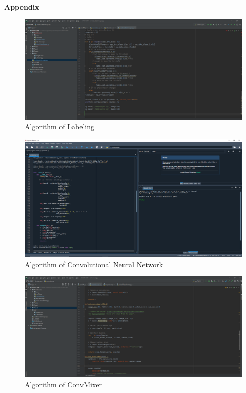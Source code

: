 \documentclass{article}
\begin{document}
\begin{center}
    \textbf{\Large Appendix}
\end{center}
\begin{figure}[H]
\begin{center}
    \includegraphics[scale=0.18]{Assets/image_creation_alg.png}
    \caption{Algorithm of Labeling}
\end{center}
\end{figure}
\noindent
\begin{figure}[H]
\begin{center}
    \includegraphics[scale=0.18]{Assets/cnn_implemantation.png}
    \caption{Algorithm of Convolutional Neural Network}
\end{center}
\end{figure}
\noindent
\begin{figure}[H]
\begin{center}
    \includegraphics[scale=0.18]{Assets/convmixer_implemantation.png}
    \caption{Algorithm of ConvMixer}
\end{center}
\end{figure}
\end{document}
